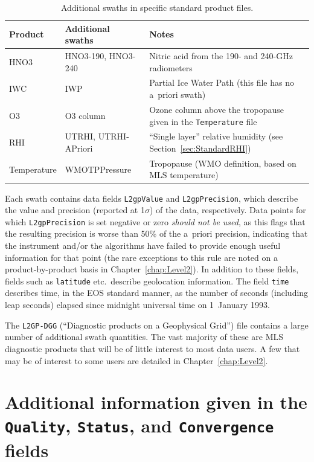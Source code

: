 \begin{table}
  \caption{Additional swaths in specific standard product
    files.\label{tab:SwathExtras}}\small
  \begin{center}
    \begin{tabular}{>{\ttfamily}l>{\ttfamily}ll}
  \toprule
  \textbf{\rmfamily Product} & \textbf{\rmfamily Additional swaths} &
  \textbf{\rmfamily Notes} \\
  \midrule
  HNO3 & HNO3-190, HNO3-240 & Nitric acid from the 190- and
  240-GHz radiometers\\
  IWC & IWP & Partial Ice Water Path (this file has no a~priori swath) \\
  O3 & O3 column & Ozone column above the tropopause given in the \texttt{Temperature} file\\
  RHI & UTRHI, UTRHI-APriori & ``Single layer'' relative humidity (see Section~\ref{sec:StandardRHI})\\
  Temperature & WMOTPPressure & Tropopause (WMO definition, based on MLS
  temperature) \\
  \bottomrule
\end{tabular}
  \end{center}
\end{table}

Each swath contains data fields \texttt{L2gpValue} and \texttt{L2gpPrecision}, which describe the value and precision (reported at 1$\sigma$) of the data, respectively. Data points for which \texttt{L2gpPrecision} is set negative or zero \emph{should not be used}, as this flags that the resulting precision is worse than 50\% of the a~priori precision, indicating that the instrument and/or the algorithms have failed to provide enough useful information for that point (the rare exceptions to this rule are noted on a product-by-product basis in Chapter~\ref{chap:Level2}). In addition to these fields, fields such as \texttt{latitude} etc.\ describe geolocation information. The field \texttt{time} describes time, in the EOS standard manner, as the number of seconds (including leap seconds) elapsed since midnight universal time on 1~January 1993.

The \texttt{L2GP-DGG} (``Diagnostic products on a Geophysical Grid'') file contains a large number of additional swath quantities. The vast majority of these are MLS diagnostic products that will be of little interest to most data users. A few that may be of interest to some users are detailed in Chapter~\ref{chap:Level2}.

\section{Additional information given in the \texttt{Quality}, \texttt{Status}, and \texttt{Convergence} fields}
\label{sec:StatusQuality}

